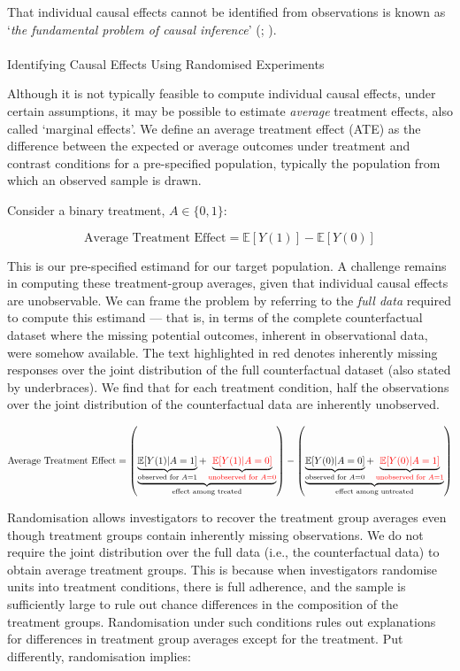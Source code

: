 \documentclass[
  single column]{article}
\makeatletter
\let\oldparagraph\paragraph
\renewcommand{\paragraph}{
    \@ifstar
      \xxxParagraphStar
      \xxxParagraphNoStar
  }
\newcommand{\xxxParagraphStar}[1]{\oldparagraph*{#1}\mbox{}}
\newcommand{\xxxParagraphNoStar}[1]{\oldparagraph{#1}\mbox{}}
\makeatother
\begin{document}
That individual causal effects cannot be identified from observations is
known as `\emph{the fundamental problem of causal inference}'
(;
).

\paragraph{Identifying Causal Effects Using Randomised
Experiments}\label{identifying-causal-effects-using-randomised-experiments}

Although it is not typically feasible to compute individual causal
effects, under certain assumptions, it may be possible to estimate
\emph{average} treatment effects, also called `marginal effects'. We
define an average treatment effect (ATE) as the difference between the
expected or average outcomes under treatment and contrast conditions for
a pre-specified population, typically the population from which an
observed sample is drawn.

Consider a binary treatment, \(A \in \{0,1\}\):

\[
\text{Average Treatment Effect} = \mathbb{E}[Y(1)] - \mathbb{E}[Y(0)]
\]

This is our pre-specified estimand for our target population. A
challenge remains in computing these treatment-group averages, given
that individual causal effects are unobservable. We can frame the
problem by referring to the \emph{full data} required to compute this
estimand --- that is, in terms of the complete counterfactual dataset
where the missing potential outcomes, inherent in observational data,
were somehow available. The text highlighted in red denotes inherently
missing responses over the joint distribution of the full counterfactual
dataset (also stated by underbraces). We find that for each treatment
condition, half the observations over the joint distribution of the
counterfactual data are inherently unobserved.

\[
\text{Average Treatment Effect} = \left(\underbrace{\underbrace{\mathbb{E}[Y(1)|A = 1]}_{\text{observed for } A = 1} + \underbrace{\textcolor{red}{\mathbb{E}[Y(1)|A = 0]}}_{\textcolor{red}{\text{unobserved for } A = 0}}}_{\text{effect among treated}}\right) - \left(\underbrace{\underbrace{\mathbb{E}[Y(0)|A = 0]}_{\text{observed for } A = 0} + \underbrace{\textcolor{red}{\mathbb{E}[Y(0)|A = 1]}}_{\textcolor{red}{\text{unobserved for } A = 1}}}_{\text{effect among untreated}}\right)
\]

Randomisation allows investigators to recover the treatment group
averages even though treatment groups contain inherently missing
observations. We do not require the joint distribution over the full
data (i.e., the counterfactual data) to obtain average treatment groups.
This is because when investigators randomise units into treatment
conditions, there is full adherence, and the sample is sufficiently
large to rule out chance differences in the composition of the treatment
groups. Randomisation under such conditions rules out explanations for
differences in treatment group averages except for the treatment. Put
differently, randomisation implies:
\end{document}
